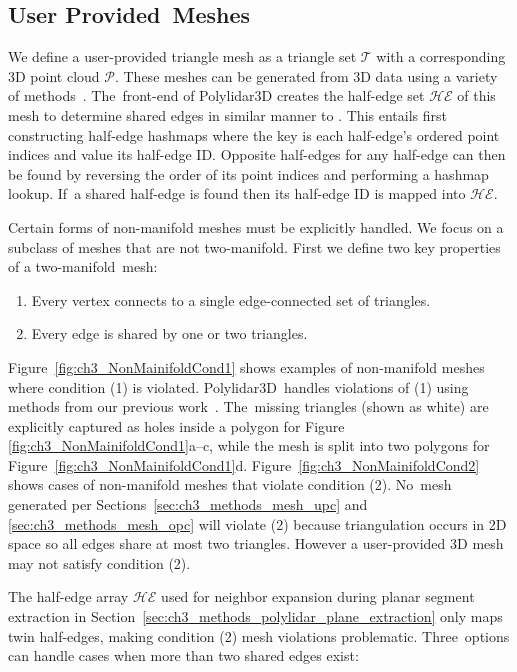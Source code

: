 

\subsection{User Provided~Meshes}\label{sec:ch3_methods_mesh_user}

We define a user-provided triangle mesh as a triangle set $\mathcal{T}$ with a corresponding 3D point cloud $\mathcal{P}$. These meshes can be generated from 3D data using a variety of methods~\cite{kazhdan_screened_2013,bernardini_ball-pivoting_1999,zhou_dense_2013}. The~front-end of Polylidar3D  creates the half-edge set $\mathcal{HE}$ of this mesh to determine shared edges in similar manner to \cite{zhou_open3d_2018}. This entails first constructing half-edge hashmaps where the key is each half-edge's ordered point indices and value its half-edge ID. Opposite half-edges for any half-edge can then be found by reversing the order of its point indices and performing a hashmap lookup. If~a shared half-edge is found then its half-edge ID is mapped into $\mathcal{HE}$.

Certain forms of non-manifold meshes must be explicitly handled. We focus on a subclass of meshes that are not two-manifold. First we define two key properties of a two-manifold~mesh: 
\begin{enumerate}
    \item Every vertex connects to a single edge-connected set of triangles.
    \item Every edge is shared by one or two triangles.
\end{enumerate}

Figure~\ref{fig:ch3_NonMainifoldCond1} shows examples of non-manifold meshes where condition (1) is violated. Polylidar3D~handles violations of (1)  using methods from our previous work~\cite{castagno_polylidar_2020}. The~missing triangles (shown as white) are explicitly captured as holes inside a polygon for Figure {\ref{fig:ch3_NonMainifoldCond1}}a--c, while the mesh is split into two polygons for Figure~\ref{fig:ch3_NonMainifoldCond1}d. Figure~\ref{fig:ch3_NonMainifoldCond2} shows cases of non-manifold meshes that violate condition (2). No~mesh generated per Sections~\ref{sec:ch3_methods_mesh_upc} and \ref{sec:ch3_methods_mesh_opc} will violate (2)  because triangulation occurs in 2D space so all edges share at most two triangles. However a user-provided 3D mesh may not satisfy condition (2).


The half-edge array $\mathcal{HE}$ used for neighbor expansion during planar segment extraction in Section~\ref{sec:ch3_methods_polylidar_plane_extraction} only maps twin half-edges, making condition (2) mesh violations problematic. Three~options can handle cases when more than two shared edges exist:

